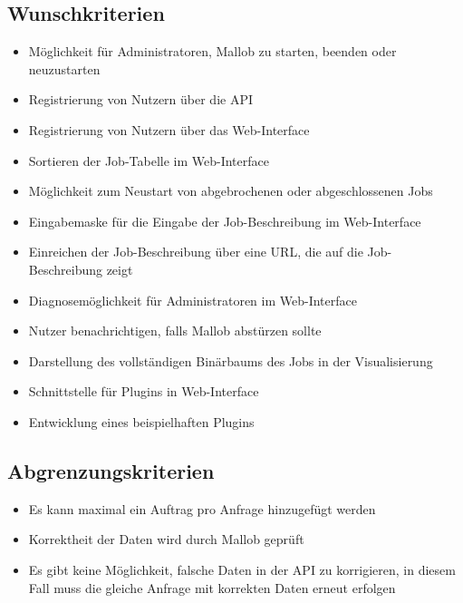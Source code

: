         
\subsection{Wunschkriterien}
    \begin{itemize}[noitemsep]
        \item Möglichkeit für Administratoren, Mallob zu starten, beenden oder neuzustarten
        \item Registrierung von Nutzern über die API
        \item Registrierung von Nutzern über das Web-Interface
        \item Sortieren der Job-Tabelle im Web-Interface
        \item Möglichkeit zum Neustart von abgebrochenen oder abgeschlossenen Jobs
        \item Eingabemaske für die Eingabe der Job-Beschreibung im Web-Interface
        \item Einreichen der Job-Beschreibung über eine URL, die auf die Job-Beschreibung zeigt
        \item Diagnosemöglichkeit für Administratoren im Web-Interface
        \item Nutzer benachrichtigen, falls Mallob abstürzen sollte
        \item Darstellung des vollständigen Binärbaums des Jobs in der Visualisierung
        \item Schnittstelle für Plugins in Web-Interface
        \item Entwicklung eines beispielhaften Plugins
    \end{itemize}
    
\subsection{Abgrenzungskriterien}
    \begin{itemize}[noitemsep]
        \item Es kann maximal ein Auftrag pro Anfrage hinzugefügt werden
        \item Korrektheit der Daten wird durch Mallob geprüft
        \item Es gibt keine Möglichkeit, falsche Daten in der API zu korrigieren, in diesem Fall muss die gleiche Anfrage mit korrekten Daten erneut erfolgen
    \end{itemize}
